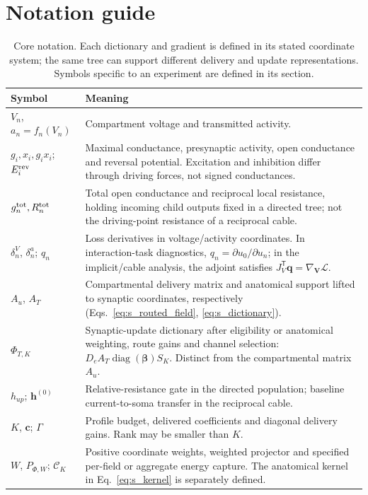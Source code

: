 \section*{Notation guide}

\begin{table}[!htbp]
\centering
\caption{Core notation. Each dictionary and gradient is defined in its stated coordinate system; the same tree can support different delivery and update representations. Symbols specific to an experiment are defined in its section.}
\label{tab:notation}
\small
\begin{tabularx}{\textwidth}{p{}X}
\toprule
Symbol & Meaning \\
\midrule
$V_n$, $a_n=f_n(V_n)$ & Compartment voltage and transmitted activity. \\
$g_i,x_i,g_ix_i$; $E_i^{\rm rev}$ & Maximal conductance, presynaptic activity, open conductance and reversal potential. Excitation and inhibition differ through driving forces, not signed conductances. \\
$g_n^{\rm tot},R_n^{\rm tot}$ & Total open conductance and reciprocal local resistance, holding incoming child outputs fixed in a directed tree; not the driving-point resistance of a reciprocal cable. \\
$\delta^V_n$, $\delta^a_n$; $q_n$ & Loss derivatives in voltage/activity coordinates. In interaction-task diagnostics, $q_n=\partial u_0/\partial u_n$; in the implicit/cable analysis, the adjoint satisfies $J_V^{\mathsf T}\bm q=\nabla_{\bm V}\mathcal L$. \\
$A_u$, $A_T$ & Compartmental delivery matrix and anatomical support lifted to synaptic coordinates, respectively (Eqs.~\ref{eq:s_routed_field}, \ref{eq:s_dictionary}). \\
$\Phi_{T,K}$ & Synaptic-update dictionary after eligibility or anatomical weighting, route gains and channel selection: $D_eA_T\operatorname{diag}(\bm\beta)S_K$. Distinct from the compartmental matrix $A_u$. \\
$h_{up}$; $\bm h^{(0)}$ & Relative-resistance gate in the directed population; baseline current-to-soma transfer in the reciprocal cable. \\
$K$, $\bm c$; $\Gamma$ & Profile budget, delivered coefficients and diagonal delivery gains. Rank may be smaller than $K$. \\
$W$, $P_{\Phi,W}$; $\mathcal C_K$ & Positive coordinate weights, weighted projector and specified per-field or aggregate energy capture. The anatomical kernel in Eq.~\ref{eq:s_kernel} is separately defined. \\

\end{tabularx}
\end{table}
